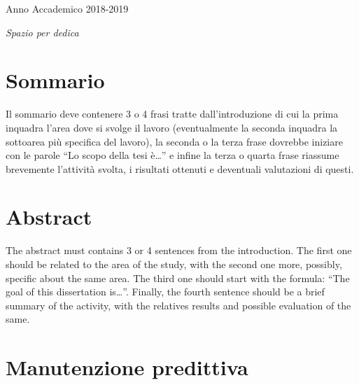 \documentclass[10pt,]{article}
\begin{document}
\vspace*{0.5cm}

\begin{center}



  Anno Accademico 2018-2019
\end{center}

\cleardoublepage

\vspace{17cm}

\large

\begin{flushright}
\itshape{ Spazio per dedica}
\end{flushright}

\cleardoublepage
{}

\section*{Sommario}\label{sommario}

Il sommario deve contenere 3 o 4 frasi tratte dall'introduzione di cui
la prima inquadra l'area dove si svolge il lavoro (eventualmente la
seconda inquadra la sottoarea più specifica del lavoro), la seconda o la
terza frase dovrebbe iniziare con le parole ``Lo scopo della tesi
è\ldots{}'' e infine la terza o quarta frase riassume brevemente
l'attività svolta, i risultati ottenuti e deventuali valutazioni di
questi.

\pagebreak

\section*{Abstract}\label{abstract}

The abstract must contains 3 or 4 sentences from the introduction. The
first one should be related to the area of the study, with the second
one more, possibly, specific about the same area. The third one should
start with the formula: ``The goal of this dissertation is\ldots{}''.
Finally, the fourth sentence should be a brief summary of the activity,
with the relatives results and possible evaluation of the same.
\pagebreak
\tableofcontents
\newpage
\listoffigures
\newpage
\listoftables

\pagebreak
{}

\section{Manutenzione predittiva}\label{manutenzione-predittiva}
\end{document}
